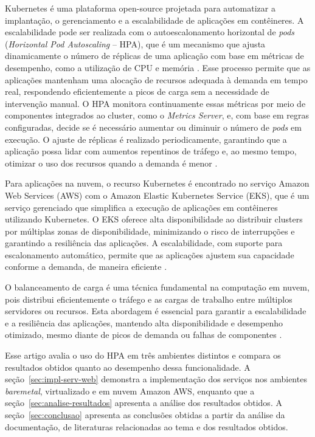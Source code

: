 \documentclass[12pt]{article}
\begin{document}
    Kubernetes é uma plataforma open-source projetada para automatizar a implantação, o gerenciamento e a escalabilidade de aplicações em contêineres. A escalabilidade pode ser realizada com o autoescalonamento horizontal de \textit{pods} (\textit{Horizontal Pod Autoscaling} -- HPA), que é um mecanismo que ajusta dinamicamente o número de réplicas de uma aplicação com base em métricas de desempenho, como a utilização de CPU e memória \cite{state_art_autoscaling}. Esse processo permite que as aplicações mantenham uma alocação de recursos adequada à demanda em tempo real, respondendo eficientemente a picos de carga sem a necessidade de intervenção manual. O HPA monitora continuamente essas métricas por meio de componentes integrados ao cluster, como o \textit{Metrics Server}, e, com base em regras configuradas, decide se é necessário aumentar ou diminuir o número de \textit{pods} em execução. O ajuste de réplicas é realizado periodicamente, garantindo que a aplicação possa lidar com aumentos repentinos de tráfego e, ao mesmo tempo, otimizar o uso dos recursos quando a demanda é menor \cite{kubernetes_horizontalpodautoscaler_nodate}.

    Para aplicações na nuvem, o recurso Kubernetes é encontrado no serviço Amazon Web Services (AWS) com o Amazon Elastic Kubernetes Service (EKS), que é um serviço gerenciado que simplifica a execução de aplicações em contêineres utilizando Kubernetes. O EKS oferece alta disponibilidade ao distribuir clusters por múltiplas zonas de disponibilidade, minimizando o risco de interrupções e garantindo a resiliência das aplicações. A escalabilidade, com suporte para escalonamento automático, permite que as aplicações ajustem sua capacidade conforme a demanda, de maneira eficiente \cite{amazon_deploy_nodate}.

    O balanceamento de carga é uma técnica fundamental na computação em nuvem, pois distribui eficientemente o tráfego e as cargas de trabalho entre múltiplos servidores ou recursos. Esta abordagem é essencial para garantir a escalabilidade e a resiliência das aplicações, mantendo alta disponibilidade e desempenho otimizado, mesmo diante de picos de demanda ou falhas de componentes \cite{enh_autoscaling_aws, load_b_AWS}.

    Esse artigo avalia o uso do HPA em três ambientes distintos e compara os resultados obtidos quanto ao desempenho dessa funcionalidade. A seção~\ref{sec:impl-serv-web} demonstra a implementação dos serviços nos ambientes \textit{baremetal}, virtualizado e em nuvem Amazon AWS, enquanto que a seção~\ref{sec:analise-resultados} apresenta a análise dos resultados obtidos. A seção~\ref{sec:conclusao} apresenta as conclusões obtidas a partir da análise da documentação, de literaturas relacionadas ao tema e dos resultados obtidos.
\end{document}
